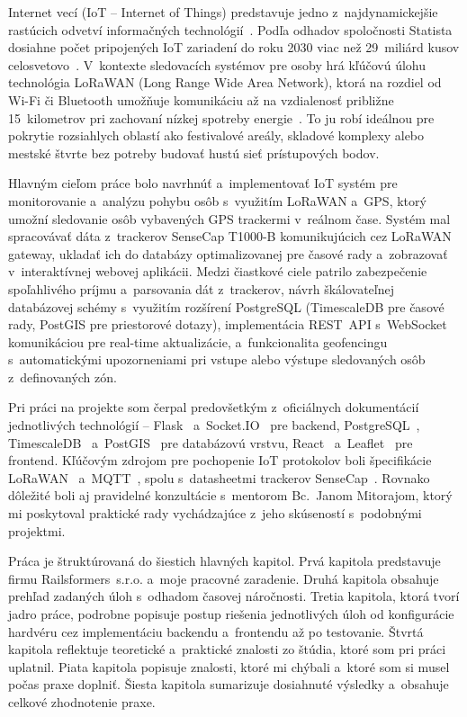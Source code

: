 Internet vecí (IoT -- Internet of Things) predstavuje jedno z~najdynamickejšie rastúcich odvetví informačných technológií~\cite{iot_principles}. Podľa odhadov spoločnosti Statista dosiahne počet pripojených IoT zariadení do roku 2030 viac než 29~miliárd kusov celosvetovo~\cite{statista_iot}. V~kontexte sledovacích systémov pre osoby hrá kľúčovú úlohu technológia LoRaWAN (Long Range Wide Area Network), ktorá na rozdiel od Wi-Fi či Bluetooth umožňuje komunikáciu až na vzdialenosť približne 15~kilometrov pri zachovaní nízkej spotreby energie~\cite{lorawan_spec}. To ju robí ideálnou pre pokrytie rozsiahlych oblastí ako festivalové areály, skladové komplexy alebo mestské štvrte bez potreby budovať hustú sieť prístupových bodov.


Hlavným cieľom práce bolo navrhnúť a~implementovať IoT systém pre monitorovanie a~analýzu pohybu osôb s~využitím LoRaWAN a~GPS, ktorý umožní sledovanie osôb vybavených GPS trackermi v~reálnom čase. Systém mal spracovávať dáta z~trackerov SenseCap T1000-B komunikujúcich cez LoRaWAN gateway, ukladať ich do databázy optimalizovanej pre časové rady a~zobrazovať v~interaktívnej webovej aplikácii. Medzi čiastkové ciele patrilo zabezpečenie spoľahlivého príjmu a~parsovania dát z~trackerov, návrh škálovateľnej databázovej schémy s~využitím rozšírení PostgreSQL (TimescaleDB pre časové rady, PostGIS pre priestorové dotazy), implementácia REST~API s~WebSocket komunikáciou pre real-time aktualizácie, a~funkcionalita geofencingu s~automatickými upozorneniami pri vstupe alebo výstupe sledovaných osôb z~definovaných zón.


Pri práci na projekte som čerpal predovšetkým z~oficiálnych dokumentácií jednotlivých technológií -- Flask~\cite{flask_docs} a~Socket.IO~\cite{socketio_docs} pre backend, PostgreSQL~\cite{postgresql_docs}, TimescaleDB~\cite{timescaledb_docs} a~PostGIS~\cite{postgis_docs} pre databázovú vrstvu, React~\cite{react_docs} a~Leaflet~\cite{leaflet_docs} pre frontend. Kľúčovým zdrojom pre pochopenie IoT protokolov boli špecifikácie LoRaWAN~\cite{lorawan_spec} a~MQTT~\cite{mqtt_spec}, spolu s~datasheetmi trackerov SenseCap~\cite{sensecap_datasheet}. Rovnako dôležité boli aj pravidelné konzultácie s~mentorom Bc.~Janom Mitorajom, ktorý mi poskytoval praktické rady vychádzajúce z~jeho skúseností s~podobnými projektmi.


Práca je štruktúrovaná do šiestich hlavných kapitol. Prvá kapitola predstavuje firmu Railsformers~s.r.o. a~moje pracovné zaradenie. Druhá kapitola obsahuje prehľad zadaných úloh s~odhadom časovej náročnosti. Tretia kapitola, ktorá tvorí jadro práce, podrobne popisuje postup riešenia jednotlivých úloh od konfigurácie hardvéru cez implementáciu backendu a~frontendu až po testovanie. Štvrtá kapitola reflektuje teoretické a~praktické znalosti zo štúdia, ktoré som pri práci uplatnil. Piata kapitola popisuje znalosti, ktoré mi chýbali a~ktoré som si musel počas praxe doplniť. Šiesta kapitola sumarizuje dosiahnuté výsledky a~obsahuje celkové zhodnotenie praxe.

\endinput
